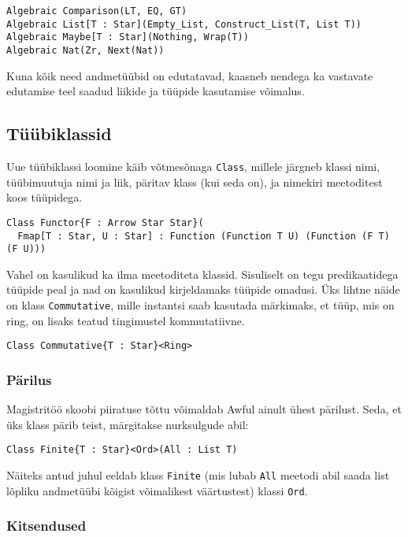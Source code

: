 \documentclass[12pt]{article}
\begin{document}
        \begin{verbatim}Algebraic Comparison(LT, EQ, GT)
Algebraic List[T : Star](Empty_List, Construct_List(T, List T))
Algebraic Maybe[T : Star](Nothing, Wrap(T))
Algebraic Nat(Zr, Next(Nat))\end{verbatim}

        Kuna kõik need andmetüübid on edutatavad, kaasneb nendega ka vastavate edutamise teel saadud liikide ja tüüpide kasutamise võimalus.
    \subsection{Tüübiklassid}
      Uue tüübiklassi loomine käib võtmesõnaga \verb!Class!, millele järgneb klassi nimi, tüübimuutuja nimi ja liik, päritav klass (kui seda on), ja nimekiri meetoditest koos tüüpidega.

      \begin{verbatim}Class Functor{F : Arrow Star Star}(
  Fmap[T : Star, U : Star] : Function (Function T U) (Function (F T) (F U)))\end{verbatim}

      Vahel on kasulikud ka ilma meetoditeta klassid. Sisuliselt on tegu predikaatidega tüüpide peal ja nad on kasulikud kirjeldamaks tüüpide omadusi. Üks lihtne näide on klass \verb!Commutative!, mille instantsi saab kasutada märkimaks, et tüüp, mis on ring, on lisaks teatud tingimustel kommutatiivne.

      \begin{verbatim}Class Commutative{T : Star}<Ring>\end{verbatim}
      \subsubsection{Pärilus}
        Magistritöö skoobi piiratuse tõttu võimaldab Awful ainult ühest pärilust. Seda, et üks klass pärib teist, märgitakse nurksulgude abil:

        \begin{verbatim}Class Finite{T : Star}<Ord>(All : List T)\end{verbatim}

        Näiteks antud juhul eeldab klass \verb!Finite! (mis lubab \verb!All! meetodi abil saada list lõpliku andmetüübi kõigist võimalikest väärtustest) klassi \verb!Ord!.
      \subsubsection{Kitsendused}
        
\end{document}
